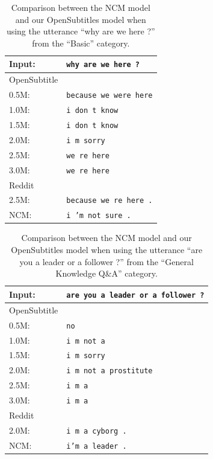 \begin{table}[H]
	\centering
	\begin{adjustbox}{max width=\textwidth}
		\begin{tabular}{ll}
			\toprule
			Input: 	& \texttt{why are we here ?}\\
			\midrule
			OpenSubtitle\\
			0.5M: 	& \texttt{because we were here}\\
			1.0M: 	& \texttt{i don t know}\\
			1.5M:	& \texttt{i don t know}\\
			2.0M:	& \texttt{i m sorry}\\
			2.5M:	& \texttt{we re here}\\
			3.0M:	& \texttt{we re here}\\
			\midrule
			Reddit\\
			2.5M:	& \texttt{because we re here .}\\
			\midrule
			NCM:	& \texttt{i ’m not sure .}\\
			\bottomrule
		\end{tabular}
	\end{adjustbox}
	\caption{Comparison between the NCM model and our OpenSubtitles model when using the utterance ``why are we here ?'' from the ``Basic'' category.}
	\label{results:example9_output:Neural_Conversational_Model_compared}
\end{table}
\begin{table}[H]
	\centering
	\begin{adjustbox}{max width=\textwidth}
		\begin{tabular}{ll}
			\toprule
			Input: 	& \texttt{are you a leader or a follower ?}\\
			\midrule
			OpenSubtitle\\
			0.5M: 	& \texttt{no}\\
			1.0M: 	& \texttt{i m not a}\\
			1.5M:	& \texttt{i m sorry}\\
			2.0M:	& \texttt{i m not a prostitute}\\
			2.5M:	& \texttt{i m a}\\
			3.0M:	& \texttt{i m a}\\
			\midrule
			Reddit\\
			2.0M:	& \texttt{i m a cyborg .}\\
			\midrule
			NCM:	& \texttt{i'm a leader .}\\
			\bottomrule
		\end{tabular}
	\end{adjustbox}
	\caption{Comparison between the NCM model and our OpenSubtitles model when using the utterance ``are you a leader or a follower ?'' from the ``General Knowledge Q\&A'' category.}
	\label{results:example10_output:Neural_Conversational_Model_compared}
\end{table}
